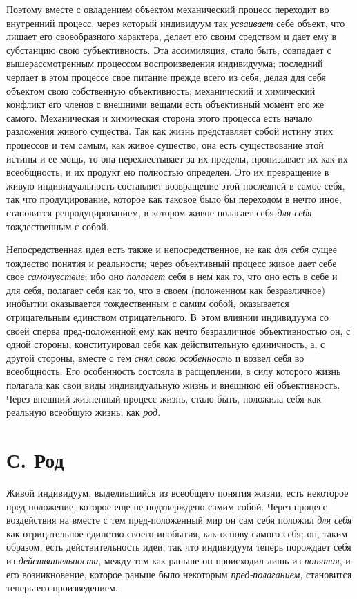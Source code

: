 {{Поэтому вместе с овладением объектом механический процесс
переходит во внутренний процесс, через который индивидуум так
{\em усваивает} себе
объект, что лишает его своеобразного характера, делает его своим средством
и дает ему в субстанцию свою субъективность. Эта ассимиляция, стало быть,
совпадает с вышерассмотренным процессом воспроизведения индивидуума;
последний черпает в этом процессе свое питание прежде всего из себя,
делая для себя объектом свою собственную объективность;
механический и химический конфликт его членов с внешними вещами есть
объективный момент его же самого. Механическая и химическая сторона этого
процесса есть начало разложения живого существа. Так как жизнь представляет
собой истину этих процессов и тем самым, как живое существо, она есть
существование этой истины и ее мощь, то она перехлестывает за их пределы,
пронизывает их как их всеобщность, и их продукт ею полностью определен. Это
их превращение в живую индивидуальность составляет возвращение этой
последней в самоё себя, так что продуцирование, которое как таковое было бы
переходом в нечто иное, становится репродуцированием, в котором живое
полагает себя {\em для себя}
тождественным с собой.

Непосредственная идея есть также и непосредственное, не как
{\em для себя} сущее
тождество понятия и реальности; через объективный процесс живое дает себе
свое {\em самочувствие};
ибо оно {\em полагает}
себя в нем как то, что оно есть в себе и для себя, полагает
себя как то, что в своем (положенном как безразличное) инобытии оказывается
тождественным с самим собой, оказывается отрицательным единством
отрицательного. В~этом влиянии индивидуума со своей сперва пред-положенной
ему как нечто безразличное объективностью он, с одной стороны,
конституировал себя как действительную единичность, а, с другой стороны,
вместе с тем {\em снял свою
особенность} и возвел себя во всеобщность. Его особенность
состояла в расщеплении, в силу которого жизнь полагала как свои виды
индивидуальную жизнь и внешнюю ей объективность. Через внешний жизненный
процесс жизнь, стало быть, положила себя как реальную всеобщую жизнь, как
{\em род}.

\section[С. Род]{С. Род}
Живой индивидуум, выделившийся из всеобщего понятия жизни,
есть некоторое пред-положение, которое еще не подтверждено самим собой.
Через процесс воздействия на вместе с тем пред-положенный мир он сам себя
положил {\em для себя}
как отрицательное единство своего инобытия, как основу самого
себя; он, таким образом, есть действительность идеи, так что индивидуум
теперь порождает себя из
{\em действительности},
между тем как раньше он происходил лишь из
{\em понятия}, и его
возникновение, которое раньше было некоторым
{\em пред-полаганием},
становится теперь его произведением.

}}
